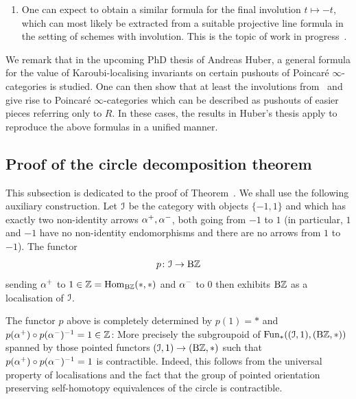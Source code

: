\begin{remark}
\begin{enumerate}
\[
\KKR^{\sym}(R[t^{\pm1}]) = [S^{\sig} \otimes \KKR^{\sym}(R)] \oplus \N\KKR^{\sym}(R) \oplus \N\KKR^{\sym}(R),
\]
where the assembly map term is replaced with tensoring with the sign representation sphere $S^{\sig}$, viewed as a genuine $\Ct$-space.
By \cite{motives}*{Theorem 6.3.1} the above nil groups vanish 
for $R$ regular noetherian of finite Krull dimension.
The analogous nil groups for quadratic $\L$-theory  %
have been shown to agree with Cappell's unitary nil terms, and are non-zero even for $R=\ZZ$, see \cite{Connolly-Ranicki}. 
\item One can expect to obtain a similar formula for the final involution $t\mapsto -t$, which can most likely be extracted from a suitable projective line formula in the setting of schemes with involution. This is the topic of work in progress~\cite{schemes-with-involution}.
\end{enumerate}
We remark that in the upcoming PhD thesis of Andreas Huber, a general formula for the value of Karoubi-localising invariants on certain pushouts of Poincaré $\infty$-categories is studied. 
One can then show that at least the involutions from~ and~
give rise to Poincar\'e $\infty$-categories which can be described as pushouts of easier pieces referring only to $R$. In these cases, the results in Huber's thesis
apply to reproduce the above formulas in a unified manner. 
\end{remark}













\subsection{Proof of the circle decomposition theorem}
\label{subsection:proof}%
This subsection is dedicated to the proof of Theorem~.
We shall use the following auxiliary construction.
Let \(\mathcal{I}\) be the category with objects \(\{-1,1\}\) and which has exactly two non-identity arrows \(\alpha^+,\alpha^-\), both going from \(-1\) to \(1\) (in particular, \(1\) and \(-1\) have no non-identity endomorphisms and there are no arrows from \(1\) to \(-1\)). 
The functor
\[
p\colon \mathcal{I} \to \mathrm{B} \mathbb{Z}
\]
sending $\alpha^+$ to $1 \in \mathbb{Z} = \operatorname{Hom}_{\mathrm{B}\mathbb{Z}}(\ast,\ast)$ and $\alpha^-$ to $0$ then exhibits $\mathrm{B}\mathbb{Z}$ as a localisation of $\mathcal{I}$.
\begin{remark}
\label{remark:unique}%
The functor $p$ above is completely determined by $p(1) = \ast$ and $p(\alpha^+) \circ p(\alpha^{-})^{-1} = 1 \in \mathbb{Z}$: More precisely the subgroupoid of $\operatorname{Fun}_*((\mathcal{I},1),(\mathrm{B}\mathbb{Z},\ast))$ spanned by those pointed functors $(\mathcal{I},1) \to (\mathrm{B}\mathbb{Z},\ast)$ such that $p(\alpha^+) \circ p(\alpha^-)^{-1} = 1$ is contractible. Indeed, this follows from the universal property of localisations and the fact that the group of pointed orientation preserving self-homotopy equivalences of the circle is contractible.

\end{remark}


